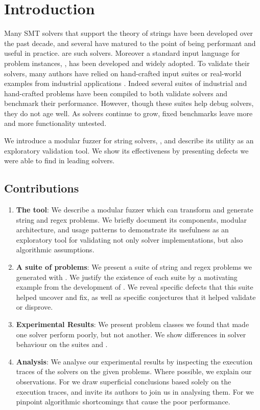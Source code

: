 \section{Introduction}

    Many SMT solvers that support the theory of strings have been developed over the past decade, and several have matured to the point of being performant and useful in practice. \theSolvers{}\cite{cvc4}\cite{z3str3} are \numSolvers{} such solvers. Moreover a standard input language for problem instances, \smt{}\cite{smt}, has been developed and widely adopted. To validate their solvers, many authors have relied on hand-crafted input suites or real-world examples from industrial applications \cite{cvc4-tests} \cite{z3str3-tests} \cite{z3str2-tests}. Indeed several suites of industrial and hand-crafted problems have been compiled \cite{kaluza} \cite{kausler} to both validate solvers and benchmark their performance. However, though these suites help debug solvers, they do not age well. As solvers continue to grow, fixed benchmarks leave more and more functionality untested.

    We introduce a modular fuzzer for string solvers, \fuzzer{}, and describe its utility as an exploratory validation tool. We show its effectiveness by presenting defects we were able to find in leading solvers.

    \subsection{Contributions}

    \begin{enumerate}
        \item \textbf{The \fuzzer{} tool}: We describe a modular fuzzer which can transform and generate \smt{} string and regex problems. We briefly document its components, modular architecture, and usage patterns to demonstrate its usefulness as an exploratory tool for validating not only solver implementations, but also algorithmic assumptions.
        \item \textbf{A suite of \smt{} problems}: We present a suite of \smt{} string and regex problems we generated with \fuzzer{}. We justify the existence of each suite by a motivating example from the development of \us{}. We reveal specific defects that this suite helped uncover and fix, as well as specific conjectures that it helped validate or disprove.
        \item \textbf{Experimental Results}: We present problem classes we found that made one solver perform poorly, but not another. We show differences in solver behaviour on the suites \cHard{} and \zHard{}.
        \item \textbf{Analysis}: We analyse our experimental results by inspecting the execution traces of the solvers on the given problems. Where possible, we explain our observations. For \cvc{} we draw superficial conclusions based solely on the execution traces, and invite its authors to join us in analysing them. For \us{} we pinpoint algorithmic shortcomings that cause the poor performance.
    \end{enumerate}
